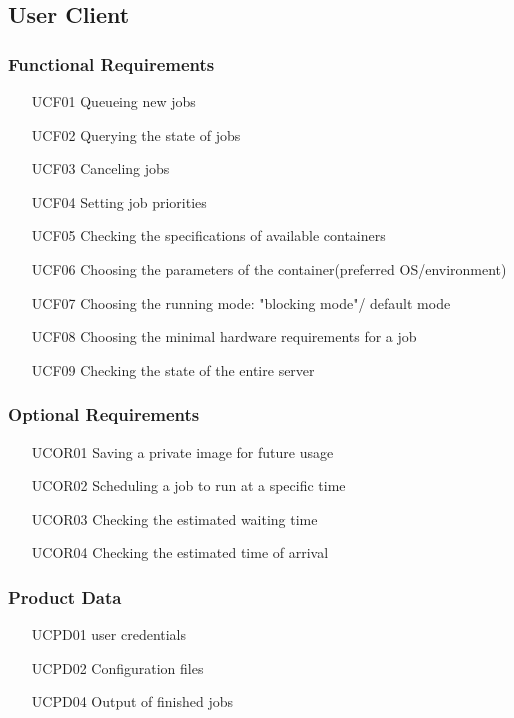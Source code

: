 \subsection{User Client}


  \subsubsection{Functional Requirements} 
  \begin{itemize}
    \item [UCF01] Queueing new jobs
    \item [UCF02] Querying the state of jobs
    \item [UCF03] Canceling jobs
    \item [UCF04] Setting job priorities 
    \item [UCF05] Checking the specifications of available containers
    \item [UCF06] Choosing the parameters of the container(preferred OS/environment)
    \item [UCF07] Choosing the running mode: "blocking mode"/ default mode
    \item [UCF08] Choosing the minimal hardware requirements for a job 
    \item [UCF09] Checking the state of the entire server
  \end{itemize}

  \subsubsection{Optional Requirements} 
  \begin{itemize}
    \item [UCOR01] Saving a private image for future usage
    \item [UCOR02] Scheduling a job to run at a specific time
    \item [UCOR03] Checking the estimated waiting time
    \item [UCOR04] Checking the estimated time of arrival
  \end{itemize}

  \subsubsection{Product Data} 
  \begin{itemize}
    \item [UCPD01] user credentials
    \item [UCPD02] Configuration files
    \item [UCPD04] Output of finished jobs
  \end{itemize}

